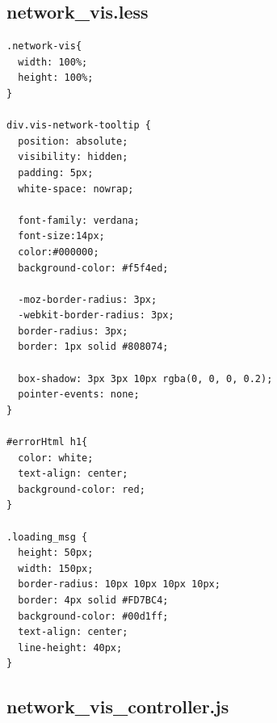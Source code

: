 \documentclass[a4paper, 12pt]{book}
\begin{document}
\subsection{network\_vis.less}

\begin{lstlisting}[frame=single]
.network-vis{
  width: 100%;
  height: 100%;
}

div.vis-network-tooltip {
  position: absolute;
  visibility: hidden;
  padding: 5px;
  white-space: nowrap;

  font-family: verdana;
  font-size:14px;
  color:#000000;
  background-color: #f5f4ed;

  -moz-border-radius: 3px;
  -webkit-border-radius: 3px;
  border-radius: 3px;
  border: 1px solid #808074;

  box-shadow: 3px 3px 10px rgba(0, 0, 0, 0.2);
  pointer-events: none;
}

#errorHtml h1{
  color: white;
  text-align: center;
  background-color: red;
}

.loading_msg {
  height: 50px;
  width: 150px;
  border-radius: 10px 10px 10px 10px;
  border: 4px solid #FD7BC4;
  background-color: #00d1ff;
  text-align: center;
  line-height: 40px;
}
\end{lstlisting}


\subsection{network\_vis\_controller.js}
\end{document}
